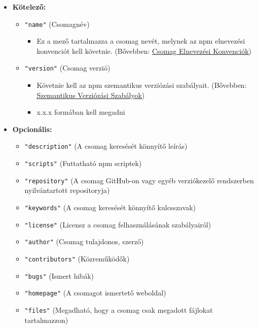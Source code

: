 	\begin{itemize}
		\item \textbf{Kötelező:}
		\begin{itemize}
			\item \texttt{"name"} (Csomagnév)
			\begin{itemize}
				\item Ez a mező tartalmazza a csomag nevét, melynek az npm elnevezési konvenciót kell követnie. (Bővebben: \hyperlink{subsection.2.2.2}{\underline{Csomag Elnevezési Konvenciók}})
			\end{itemize}
			\item \texttt{"version"} (Csomag verzió)
			\begin{itemize}
				\item Követnie kell az npm szemantikus verziózási szabályait. (Bővebben: \hyperlink{subsection.2.2.3}{\underline{Szemantikus Verziózási Szabályok}}) 
				\item x.x.x formában kell megadni
			\end{itemize}
		\end{itemize}
		\item \textbf{Opcionális:}
		\begin{itemize}
			\item \texttt{"description"} (A csomag keresését könnyítő leírás)	
			\item \texttt{"scripts"} (Futtatható npm scriptek)
			\item \texttt{"repository"} (A csomag GitHub-on vagy egyéb verziókezelő rendszerben nyilvántartott repositoryja)
			\item \texttt{"keywords"} (A csomag keresését könnyítő kulcsszavak)
			\item \texttt{"license"} (Licensz a csomag felhasználásának szabályairól)
			\item \texttt{"author"} (Csomag tulajdonos, szerző)
			\item \texttt{"contributors"} (Közreműködők)
			\item \texttt{"bugs"} (Ismert hibák)
			\item \texttt{"homepage"} (A csomagot ismertető weboldal)
			\item \texttt{"files"} (Megadható, hogy a csomag csak megadott fájlokat  tartalmazzon)
			
			\clearpage
			

\end{itemize}
\end{itemize}
